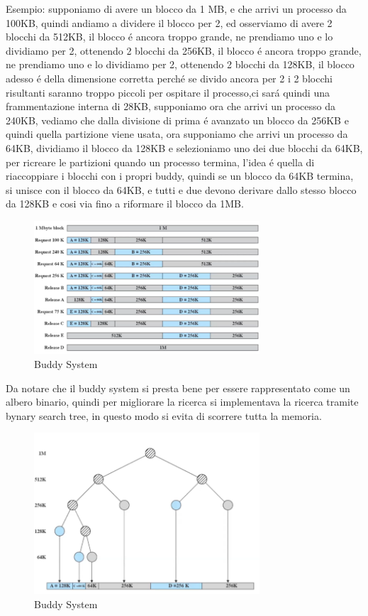     Esempio: supponiamo di avere un blocco da 1 MB, e che arrivi un processo da 100KB, quindi andiamo a dividere
    il blocco per 2, ed osserviamo di avere 2 blocchi da 512KB, il blocco é ancora troppo grande, ne prendiamo uno
    e lo dividiamo per 2, ottenendo 2 blocchi da 256KB, il blocco é ancora troppo grande, ne prendiamo uno e lo dividiamo
    per 2, ottenendo 2 blocchi da 128KB, il blocco adesso é della dimensione corretta perché se divido ancora per 2 i 2 blocchi
    risultanti saranno troppo piccoli per ospitare il processo,ci sará quindi una frammentazione interna di 28KB, supponiamo
    ora  che arrivi un processo da 240KB, vediamo che dalla divisione di prima é avanzato un blocco da 256KB e quindi
    quella partizione viene usata, ora supponiamo che arrivi un processo da 64KB, dividiamo il blocco da 128KB e selezioniamo
    uno dei due blocchi da 64KB, per ricreare le partizioni quando un processo termina, l'idea é quella di riaccoppiare i blocchi
    con i propri buddy, quindi se un blocco da 64KB termina, si unisce con il blocco da 64KB, e tutti e due devono derivare
    dallo stesso blocco da 128KB e cosi via fino a riformare il blocco da 1MB.
    \begin{figure}[H]
        \centering
        \includegraphics[width=0.75\textwidth]{immagini/BuddySystem1}
        \caption{Buddy System}
    \end{figure}
    Da notare che il buddy system si presta bene per essere rappresentato come un albero binario, quindi
    per migliorare la ricerca si implementava la ricerca tramite bynary search tree, in questo modo si evita di scorrere tutta
    la memoria.
    \begin{figure}[H]
        \centering
        \includegraphics[width=0.75\textwidth]{immagini/BuddySystemAlbero}
        \caption{Buddy System}
    \end{figure}
